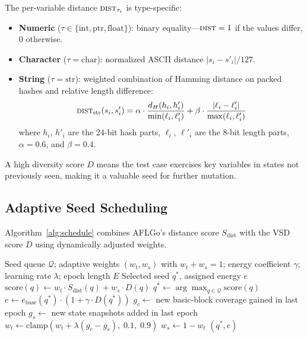 \documentclass[preprint,12pt,3p]{elsarticle}
\begin{document}
The per-variable distance $\textsc{dist}_{\tau_i}$ is type-specific:
\begin{itemize}
  \item \textbf{Numeric} ($\tau \in \{\text{int}, \text{ptr}, \text{float}\}$):
    binary equality---$\textsc{dist} = 1$ if the values differ, $0$ otherwise.
  \item \textbf{Character} ($\tau = \text{char}$): normalized ASCII distance
    $|s_i - s'_i| / 127$.
  \item \textbf{String} ($\tau = \text{str}$): weighted combination of
    Hamming distance on packed hashes and relative length difference:
    \begin{equation}
      \textsc{dist}_{\text{str}}(s_i,s'_i) =
        \alpha \cdot \frac{d_H(h_i, h'_i)}{\min(\ell_i,\ell'_i)}
        + \beta \cdot \frac{|\ell_i - \ell'_i|}{\max(\ell_i,\ell'_i)}
      \label{eq:strdist}
    \end{equation}
    where $h_i$, $h'_i$ are the 24-bit hash parts, $\ell_i$, $\ell'_i$ are
    the 8-bit length parts, $\alpha=0.6$, and $\beta=0.4$.
\end{itemize}
A high diversity score $D$ means the test case exercises key variables in
states not previously seen, making it a valuable seed for further mutation.

\subsection{Adaptive Seed Scheduling}
\label{sec:schedule}

Algorithm~\ref{alg:schedule} combines AFLGo's distance score
$S_{\text{dist}}$ with the VSD score $D$ using dynamically adjusted weights.

\begin{algorithm}[t]
\caption{Adaptive Seed Scheduling}
\label{alg:schedule}
\begin{algorithmic}[1]
\Require Seed queue $\mathcal{Q}$; adaptive weights $(w_t, w_s)$ with
  $w_t + w_s = 1$; energy coefficient $\gamma$; learning rate $\lambda$;
  epoch length $E$
\Ensure Selected seed $q^*$, assigned energy $e$
  \State $\text{score}(q) \leftarrow
    w_t \cdot S_{\text{dist}}(q) + w_s \cdot D(q)$
\EndFor
\State $q^* \leftarrow \arg\max_{q \in \mathcal{Q}} \text{score}(q)$
\State $e \leftarrow e_{\text{base}}(q^*) \cdot (1 + \gamma \cdot D(q^*))$
  \State $g_c \leftarrow$ new basic-block coverage gained in last epoch
  \State $g_s \leftarrow$ new state snapshots added in last epoch
  \State $w_t \leftarrow \text{clamp}(w_t + \lambda(g_c - g_s),\; 0.1,\; 0.9)$
  \State $w_s \leftarrow 1 - w_t$
\EndIf
\State \Return $(q^*, e)$
\end{algorithmic}
\end{algorithm}
\end{document}
